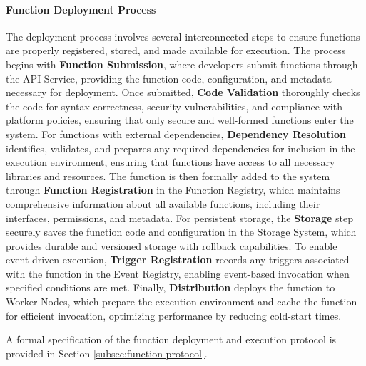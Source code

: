\documentclass[12pt,a4paper]{article}
\begin{document}
\paragraph{Function Deployment Process}
The deployment process involves several interconnected steps to ensure functions are properly registered, stored, and made available for execution. The process begins with \textbf{Function Submission}, where developers submit functions through the API Service, providing the function code, configuration, and metadata necessary for deployment. Once submitted, \textbf{Code Validation} thoroughly checks the code for syntax correctness, security vulnerabilities, and compliance with platform policies, ensuring that only secure and well-formed functions enter the system. For functions with external dependencies, \textbf{Dependency Resolution} identifies, validates, and prepares any required dependencies for inclusion in the execution environment, ensuring that functions have access to all necessary libraries and resources. The function is then formally added to the system through \textbf{Function Registration} in the Function Registry, which maintains comprehensive information about all available functions, including their interfaces, permissions, and metadata. For persistent storage, the \textbf{Storage} step securely saves the function code and configuration in the Storage System, which provides durable and versioned storage with rollback capabilities. To enable event-driven execution, \textbf{Trigger Registration} records any triggers associated with the function in the Event Registry, enabling event-based invocation when specified conditions are met. Finally, \textbf{Distribution} deploys the function to Worker Nodes, which prepare the execution environment and cache the function for efficient invocation, optimizing performance by reducing cold-start times.

A formal specification of the function deployment and execution protocol is provided in Section \ref{subsec:function-protocol}.




\end{document}
